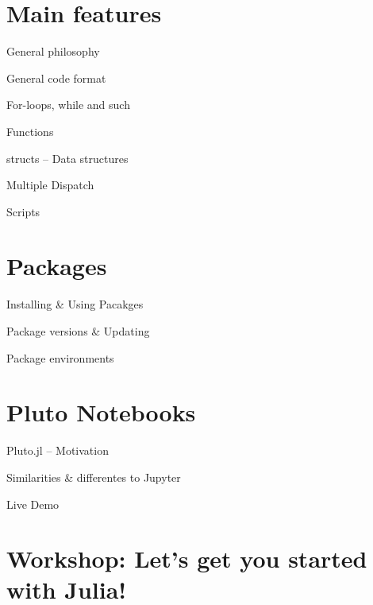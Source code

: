 \documentclass[aspectratio=169, handout]{beamer}
\begin{document}
    \section{Main features}
    \begin{frame}{General philosophy}

    \end{frame}
    \begin{frame}{General code format}

    \end{frame}
    \begin{frame}{For-loops, while and such}

    \end{frame}
    \begin{frame}{Functions}

    \end{frame}
    \begin{frame}{structs – Data structures}

    \end{frame}
    \begin{frame}{Multiple Dispatch}

    \end{frame}
    \begin{frame}{Scripts}

    \end{frame}
    \section{Packages}
    \begin{frame}{Installing \& Using Pacakges}

    \end{frame}
    \begin{frame}{Package versions \& Updating}

    \end{frame}
    \begin{frame}{Package environments}

    \end{frame}
    \section{Pluto Notebooks}
    \begin{frame}{Pluto.jl – Motivation}
    \end{frame}
    \begin{frame}{Similarities \& differentes to Jupyter}
    \end{frame}
    \begin{frame}{Live Demo}
    \end{frame}
    \section{Workshop: Let's get you started with Julia!}
\end{document}
